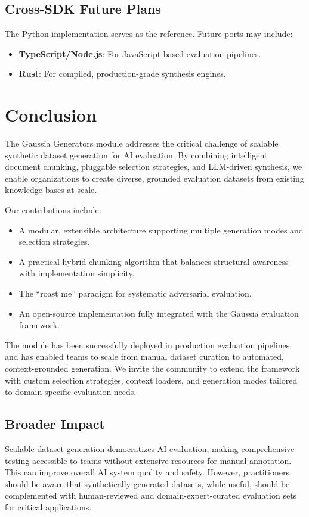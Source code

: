 \documentclass[11pt,a4paper]{article}
\begin{document}
\subsection{Cross-SDK Future Plans}

The Python implementation serves as the reference. Future ports may include:

\begin{itemize}
    \item \textbf{TypeScript/Node.js}: For JavaScript-based evaluation pipelines.
    \item \textbf{Rust}: For compiled, production-grade synthesis engines.
\end{itemize}

\section{Conclusion}

The Gaussia Generators module addresses the critical challenge of scalable synthetic dataset generation for AI evaluation. By combining intelligent document chunking, pluggable selection strategies, and LLM-driven synthesis, we enable organizations to create diverse, grounded evaluation datasets from existing knowledge bases at scale.

Our contributions include:

\begin{itemize}
    \item A modular, extensible architecture supporting multiple generation modes and selection strategies.
    \item A practical hybrid chunking algorithm that balances structural awareness with implementation simplicity.
    \item The ``roast me'' paradigm for systematic adversarial evaluation.
    \item An open-source implementation fully integrated with the Gaussia evaluation framework.
\end{itemize}

The module has been successfully deployed in production evaluation pipelines and has enabled teams to scale from manual dataset curation to automated, context-grounded generation. We invite the community to extend the framework with custom selection strategies, context loaders, and generation modes tailored to domain-specific evaluation needs.

\subsection{Broader Impact}

Scalable dataset generation democratizes AI evaluation, making comprehensive testing accessible to teams without extensive resources for manual annotation. This can improve overall AI system quality and safety. However, practitioners should be aware that synthetically generated datasets, while useful, should be complemented with human-reviewed and domain-expert-curated evaluation sets for critical applications.



\end{document}
